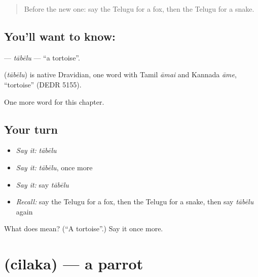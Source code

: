 \label{lesson:TE-C124-tabelu}



\begin{quote}
Before the new one: say the Telugu for a fox, then the Telugu for a snake.
\end{quote}

\subsection*{You'll want to know: }
\textbf{} — \emph{tābēlu} — \textquotedblleft{}a tortoise\textquotedblright{}.

\begin{cousinweb}
\textbf{} (\emph{tābēlu}) is native Dravidian, one word with Tamil \emph{āmai} and Kannada \emph{āme}, \textquotedblleft{}tortoise\textquotedblright{} (DEDR 5155).
\end{cousinweb}

\begin{grammarlens}[title={What you've built}]
One more word for this chapter.
\end{grammarlens}

\subsection*{Your turn}
\begin{itemize}
\raggedright
  \item \emph{Say it:} \emph{tābēlu}
  \item \emph{Say it:} \emph{tābēlu}, once more
  \item \emph{Say it:} say \emph{tābēlu}
  \item \emph{Recall:} say the Telugu for a fox, then the Telugu for a snake, then say \emph{tābēlu} again
\end{itemize}

\begin{tcolorbox}[breakable,colback=teal!4,colframe=teal!35!black,title={Before you move on}]
What does  mean? (\textquotedblleft{}A tortoise\textquotedblright{}.) Say it once more.
\end{tcolorbox}
\section[\texorpdfstring{\te{చిలక} (cilaka)}{చిలక (cilaka)}]{ (cilaka) — a parrot}

\label{lesson:TE-C124-cilaka}



